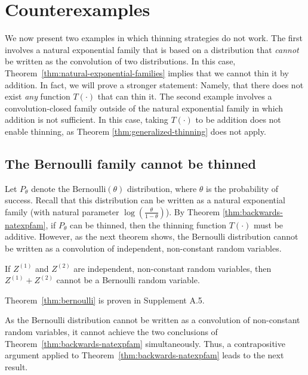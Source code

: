 \documentclass[12pt]{article}
\begin{document}
\section{Counterexamples}
\label{sec:counterexamples}

We now present two examples in which thinning strategies do not work.
The first  involves a natural exponential family that is based on a distribution that {\em cannot} be written as the convolution of two distributions. In this case, Theorem~\ref{thm:natural-exponential-families} implies that we cannot thin it by addition. In fact, we will prove a stronger statement: Namely, that  there does not exist \emph{any} function $T(\cdot)$ that can thin it.  The second example involves a convolution-closed family outside of the natural exponential family in which addition is not sufficient. In this case, taking $T(\cdot)$ to be addition does not enable thinning, as Theorem \ref{thm:generalized-thinning} does not apply.

\subsection{The Bernoulli family cannot be thinned}
\label{sec:bernoulli}

Let $P_{\theta}$ denote the $\mathrm{Bernoulli}(\theta)$ distribution, where $\theta$ is the probability of success. Recall that this distribution can be written as a natural exponential family (with natural parameter $\log \left( \frac{\theta}{1 - \theta} \right)$). By Theorem \ref{thm:backwards-natexpfam}, if $P_\theta$ can be thinned, then the thinning function $T(\cdot)$ must be  additive. However, as the next theorem shows, the Bernoulli distribution cannot be written as a convolution of independent, non-constant random variables.

\begin{theorem}\label{thm:bernoulli}
If $Z^{(1)}$ and $Z^{(2)}$ are independent, non-constant random variables, then $Z^{(1)}+Z^{(2)}$
cannot be a Bernoulli random variable.
\end{theorem}

Theorem~\ref{thm:bernoulli} is proven in Supplement A.5. 

As the Bernoulli distribution cannot be written as a convolution of non-constant random variables, it cannot achieve the two conclusions of Theorem~\ref{thm:backwards-natexpfam} simultaneously. Thus, a contrapositive argument applied to Theorem~\ref{thm:backwards-natexpfam} leads to the next result.
\end{document}

